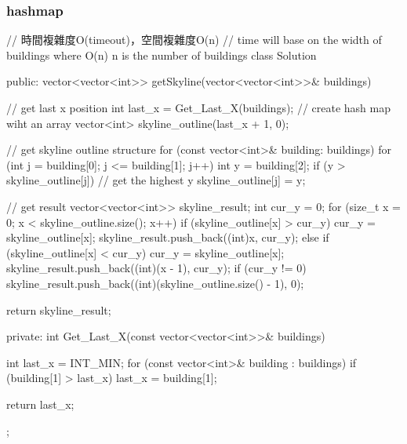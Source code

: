 \subsubsection{hashmap}
\begin{Code}
  // 時間複雜度O(timeout)，空間複雜度O(n)
  // time will base on the width of buildings where O(n) n is the number of buildings
class Solution
{
public:
    vector<vector<int>> getSkyline(vector<vector<int>>& buildings)
    {
        // get last x position
        int last_x = Get_Last_X(buildings);
        // create hash map wiht an array
        vector<int> skyline_outline(last_x + 1, 0);

        // get skyline outline structure
        for (const vector<int>& building: buildings)
        {
            for (int j = building[0]; j <= building[1]; j++)
            {
                int y = building[2];
                if (y > skyline_outline[j])
                    // get the highest y
                    skyline_outline[j] = y;
            }
        }

        // get result
        vector<vector<int>> skyline_result;
        int cur_y = 0;
        for (size_t x = 0; x < skyline_outline.size(); x++)
        {
            if (skyline_outline[x] > cur_y)
            {
                cur_y = skyline_outline[x];
                skyline_result.push_back({(int)x, cur_y});
            }
            else if (skyline_outline[x] < cur_y)
            {
                cur_y = skyline_outline[x];
                skyline_result.push_back({(int)(x - 1), cur_y});
            }
        }
        if (cur_y != 0)
        {
            skyline_result.push_back({(int)(skyline_outline.size() - 1), 0});
        }

        return skyline_result;
    }
private:
    int Get_Last_X(const vector<vector<int>>& buildings)
    {
        int last_x = INT_MIN;
        for (const vector<int>& building : buildings)
        {
            if (building[1] > last_x)
                last_x = building[1];
        }

        return last_x;
    }
};
\end{Code}
